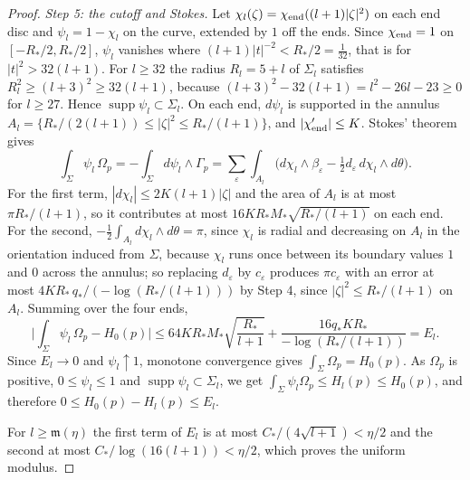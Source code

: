 \begin{proof}
\emph{Step 5: the cutoff and Stokes.} Let $\chi_l(\zeta)=\chi_{\rm end}((l+1)|\zeta|^2)$ on each end disc and
$\psi_l=1-\chi_l$ on the curve, extended by $1$ off the ends. Since $\chi_{\rm end}=1$ on $[-R_*/2,R_*/2]$, $\psi_l$
vanishes where $(l+1)|t|^{-2}<R_*/2=\frac1{32}$, that is for $|t|^2>32(l+1)$. For $l\ge32$ the radius
$R_l=5+l$ of $\Sigma_l$ satisfies $R_l^2\ge(l+3)^2\ge32(l+1)$, because $(l+3)^2-32(l+1)=l^2-26l-23\ge0$ for
$l\ge27$. Hence $\operatorname{supp}\psi_l\subset\Sigma_l$. On each end, $d\psi_l$ is supported in the annulus
$A_l=\{R_*/(2(l+1))\le|\zeta|^2\le R_*/(l+1)\}$, and $|\chi_{\rm end}'|\le K$. Stokes' theorem gives
\[
 \int_\Sigma\psi_l\,\Omega_p=-\int_\Sigma d\psi_l\wedge\Gamma_p
 =\sum_\varepsilon\int_{A_l}\Big(d\chi_l\wedge\beta_\varepsilon-\tfrac12d_\varepsilon\,d\chi_l\wedge d\theta\Big).
\]
For the first term, $|d\chi_l|\le2K(l+1)|\zeta|$ and the area of $A_l$ is at most $\pi R_*/(l+1)$, so it contributes at
most $16KR_*M_*\sqrt{R_*/(l+1)}$ on each end. For the second, $-\frac12\int_{A_l}d\chi_l\wedge d\theta=\pi$, since $\chi_l$ is radial and decreasing on $A_l$ in the orientation induced from $\Sigma$, because
$\chi_l$ runs once between its boundary values $1$ and $0$ across the annulus; so replacing $d_\varepsilon$ by
$c_\varepsilon$ produces $\pi c_\varepsilon$ with an error
at most $4KR_*\,q_*/(-\log(R_*/(l+1)))$ by Step 4, since $|\zeta|^2\le R_*/(l+1)$ on $A_l$. Summing over the four ends,
\[
 \Big|\int_\Sigma\psi_l\,\Omega_p-H_0(p)\Big|\le
 64KR_*M_*\sqrt{\frac{R_*}{l+1}}+\frac{16q_*KR_*}{-\log(R_*/(l+1))}=E_l .
\]
Since $E_l\to0$ and $\psi_l\uparrow1$, monotone convergence gives $\int_\Sigma\Omega_p=H_0(p)$. As $\Omega_p$ is positive,
$0\le\psi_l\le1$ and $\operatorname{supp}\psi_l\subset\Sigma_l$, we get $\int_\Sigma\psi_l\Omega_p\le H_l(p)\le H_0(p)$, and therefore
$0\le H_0(p)-H_l(p)\le E_l$.

For $l\ge\mathfrak m(\eta)$ the first term of $E_l$ is at most $C_*/(4\sqrt{l+1})<\eta/2$ and the second at most
$C_*/\log(16(l+1))<\eta/2$, which proves the uniform modulus.
\end{proof}

